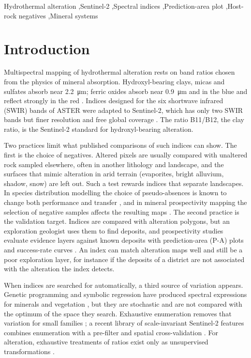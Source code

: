 \documentclass[preprint,authoryear,number]{elsarticle}
\begin{document}
\begin{frontmatter}
\begin{keyword}
Hydrothermal alteration \sep Sentinel-2 \sep Spectral indices \sep Prediction-area plot \sep Host-rock negatives \sep Mineral systems
\end{keyword}
\end{frontmatter}

\section{Introduction}
\label{sec:intro}

Multispectral mapping of hydrothermal alteration rests on band ratios chosen from the physics of mineral absorption. Hydroxyl-bearing clays, micas and sulfates absorb near \SI{2.2}{\micro\meter}; ferric oxides absorb near \SI{0.9}{\micro\meter} and in the blue and reflect strongly in the red \citep{Hunt1977,Sabins1999}. Indices designed for the six shortwave infrared (SWIR) bands of ASTER \citep{Ninomiya2005,Mars2006,Mars2010} were adapted to Sentinel-2, which has only two SWIR bands but finer resolution and free global coverage \citep{vanderMeer2014,vanderWerff2016,Pour2018}. The ratio B11/B12, the clay ratio, is the Sentinel-2 standard for hydroxyl-bearing alteration.

Two practices limit what published comparisons of such indices can show. The first is the choice of negatives. Altered pixels are usually compared with unaltered rock sampled elsewhere, often in another lithology and landscape, and the surfaces that mimic alteration in arid terrain (evaporites, bright alluvium, shadow, snow) are left out. Such a test rewards indices that separate landscapes. In species distribution modelling the choice of pseudo-absences is known to change both performance and transfer \citep{Phillips2009,BarbetMassin2012}, and in mineral prospectivity mapping the selection of negative samples affects the resulting maps \citep{Zuo2020,Zhang2025}. The second practice is the validation target. Indices are compared with alteration polygons, but an exploration geologist uses them to find deposits, and prospectivity studies evaluate evidence layers against known deposits with prediction-area (P-A) plots and success-rate curves \citep{Chung2003,Yousefi2015}. An index can match alteration maps well and still be a poor exploration layer, for instance if the deposits of a district are not associated with the alteration the index detects.

When indices are searched for automatically, a third source of variation appears. Genetic programming and symbolic regression have produced spectral expressions for minerals and vegetation \citep{Ross2005,Momm2011,Chrysostomou2026}, but they are stochastic and are not compared with the optimum of the space they search. Exhaustive enumeration removes that variation for small families \citep{Thenkabail2000,Bartlett2024,Kronberger2024}; a recent library of scale-invariant Sentinel-2 features combines enumeration with a pre-filter and spatial cross-validation \citep{Lotfi2026}. For alteration, exhaustive treatments of ratios exist only as unsupervised transformations \citep{Askari2018}.
\end{document}
